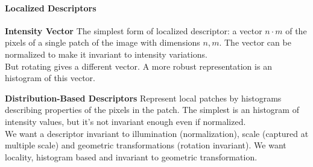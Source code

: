 \documentclass[10pt]{report}
\begin{document}
\paragraph{Localized Descriptors}
\begin{list}{}{}
	\item \textbf{Intensity Vector} The simplest form of localized descriptor: a vector $n\cdot m$ of the pixels of a single patch of the image with dimensions $n,m$. The vector can be normalized to make it invariant to intensity variations.\\
	But rotating gives a different vector. A more robust representation is an histogram of this vector.
	\item \textbf{Distribution-Based Descriptors} Represent local patches by histograms describing properties of the pixels in the patch. The simplest is an histogram of intensity values, but it's not invariant enough even if normalized.\\
	We want a descriptor invariant to illumination (normalization), scale (captured at multiple scale) and geometric transformations (rotation invariant). We want locality, histogram based and invariant to geometric transformation.
\end{list}
\end{document}
